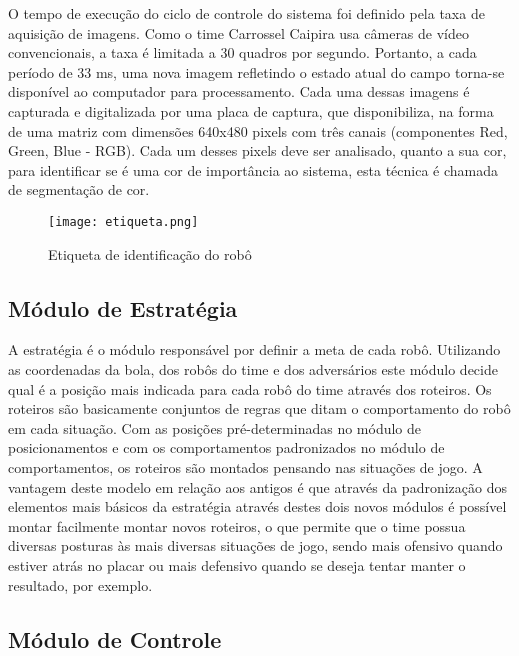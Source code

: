 O tempo de execução do ciclo de controle do sistema foi definido pela taxa de aquisição de imagens. Como o time Carrossel Caipira usa câmeras de vídeo convencionais, a taxa é limitada a 30 quadros por segundo. Portanto, a cada período de 33 ms, uma nova imagem refletindo o estado atual do campo torna-se disponível ao computador para processamento. Cada uma dessas imagens é capturada e digitalizada por uma placa
de captura, que disponibiliza, na forma de uma matriz com dimensões 640x480 pixels com três canais (componentes Red, Green, Blue - RGB). Cada um desses pixels deve ser analisado, quanto a sua cor, para identificar se é uma cor de importância ao sistema, esta técnica é chamada de segmentação de cor.

\begin{figure}[!htb]
\centering
\texttt{[image: etiqueta.png]}
\caption{ Etiqueta de identificação do robô}
\label{fig:etiqueta}
\end{figure}

\subsection{Módulo de Estratégia}

A estratégia é o módulo responsável por definir a meta de cada robô. Utilizando as coordenadas da bola, dos robôs do time e dos adversários este módulo decide qual é a posição mais indicada para cada robô do time através dos roteiros. Os roteiros são basicamente conjuntos de regras que ditam o comportamento do robô em cada situação. Com as posições pré-determinadas no módulo de posicionamentos e com os comportamentos padronizados no módulo de comportamentos, os roteiros são montados pensando nas situações de jogo. A vantagem deste modelo em relação aos antigos é que através da padronização dos elementos mais básicos da estratégia através destes dois novos módulos é possível montar facilmente montar novos roteiros, o que permite que o time possua diversas posturas às mais diversas situações de jogo, sendo mais ofensivo quando estiver atrás no placar ou mais defensivo quando se deseja tentar manter o resultado, por exemplo.

\subsection{Módulo de Controle}

